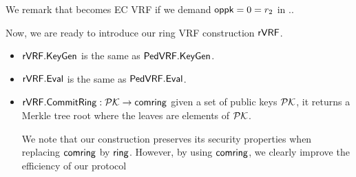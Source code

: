 \noindent We remark that \PedVRF becomes EC VRF if we demand $\mathsf{oppk} = 0 = r_2$ in \PedVRF.\Sign.


\smallskip

Now, we are ready to introduce our ring VRF construction  $ {\mathsf{rVRF}} $.

\begin{itemize}
	\item ${\mathsf{rVRF}}.{\mathsf{KeyGen}} $ is the same as $ {\mathsf{PedVRF}}.{\mathsf{KeyGen}}$.
	\item ${\mathsf{rVRF}}.{\mathsf{Eval}} $ is the same as $ {\mathsf{PedVRF}}.{\mathsf{Eval}}$.
	\item $ {\mathsf{rVRF}}.{\mathsf{CommitRing}}: {\mathcal{PK}} \rightarrow \mathsf{comring}$ given a set of public keys $ {\mathcal{PK}} $, it returns a Merkle tree root where the leaves are elements of  $ {\mathcal{PK}}$. 
	
	We note that our construction preserves its security properties when replacing $ \mathsf{comring} $
	by $ \mathsf{ring} $. However, by using $ \mathsf{comring} $, we clearly improve the efficiency of our protocol
	
\end{itemize}



